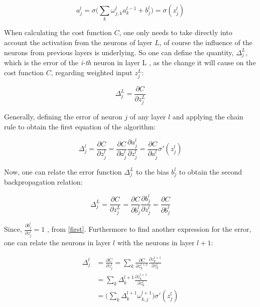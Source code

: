 \begin{equation}
	a_j^l = \sigma\bigg(\sum_{k}\omega_{j,k}^l a_k^{l-1} + b_j^{l} \bigg) = \sigma(z_j^l)
	\label{first}
\end{equation}

When calculating the cost function $C$, one only needs to take directly into account the activation from the neurons of layer $L$, of course the influence of the neurons from previous layers is underlying. So one can define the quantity, $ \Delta_j^L$, which is the error of the \textit{i-th} neuron in layer L , as the change it will cause on the cost function $C$, regarding weighted input $z_j^L$:

\begin{equation}
	\Delta_j^L = \frac{\partial C}{\partial z_j^L}
\end{equation}

Generally, defining the error of neuron $j$ of any layer $l$ and applying the chain rule to obtain the first equation of the algorithm:

\begin{equation}
	\Delta_j^l = \frac{\partial C}{\partial z_j^l} =  \frac{\partial C}{\partial a_j^l} \frac{\partial a_j^l}{\partial z_j^l} =  \frac{\partial C}{\partial a_j^l} \sigma '(z_j^l)
	\label{backprop1}
\end{equation}

Now, one can relate the error function $ \Delta_j^L$ to the bias $b_j^{l}$ to obtain the second backpropagation relation:

\begin{equation}
	\Delta_j^L = \frac{\partial C}{\partial z_j^L} = \frac{\partial C}{\partial b_j^l} \frac{\partial b_j^l}{\partial z_j^l} = \frac{\partial C}{\partial b_j^l}
	\label{backprop2}
\end{equation}

Since, $\frac{\partial b_j^l}{\partial z_j^l} = 1$ , from \ref{first}. 
Furthermore to find another expression for the error, one can relate the neurons in layer $l$ with the neurons in layer $l+1$: 

\begin{align}
	\Delta_j^l &= \frac{\partial C}{\partial z_j^l} = \sum_k \frac{\partial C}{\partial z_k^{l+1}} \frac{\partial z_k^{l+1}}{\partial z_k^{l}} \\
	&= \sum_k  \Delta_k^{l+1}  \frac{\partial z_k^{l+1}}{\partial z_k^{l}} \\
	&= \bigg( \sum_k  \Delta_k^{l+1} \omega_{k,j}^{l+1}\bigg) \sigma '(z_j^l)
	\label{backprop3}
\end{align}


